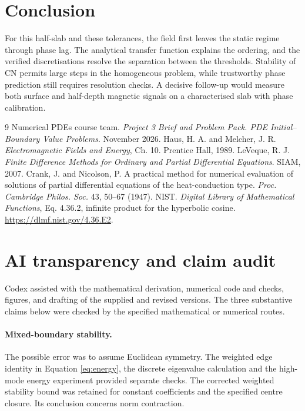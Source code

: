 \documentclass[11pt,a4paper]{article}
\begin{document}
\section{Conclusion}
For this half-slab and these tolerances, the field first leaves the static regime through phase lag. The analytical transfer function explains the ordering, and the verified discretisations resolve the separation between the thresholds. Stability of CN permits large steps in the homogeneous problem, while trustworthy phase prediction still requires resolution checks. A decisive follow-up would measure both surface and half-depth magnetic signals on a characterised slab with phase calibration.

\begin{thebibliography}{9}
 Numerical PDEs course team. \emph{Project 3 Brief and Problem Pack. PDE Initial--Boundary Value Problems}. November 2026.
 Haus, H. A. and Melcher, J. R. \emph{Electromagnetic Fields and Energy}, Ch. 10. Prentice Hall, 1989.
 LeVeque, R. J. \emph{Finite Difference Methods for Ordinary and Partial Differential Equations}. SIAM, 2007.
 Crank, J. and Nicolson, P. A practical method for numerical evaluation of solutions of partial differential equations of the heat-conduction type. \emph{Proc. Cambridge Philos. Soc.} 43, 50--67 (1947).
 NIST. \emph{Digital Library of Mathematical Functions}, Eq. 4.36.2, infinite product for the hyperbolic cosine. \url{https://dlmf.nist.gov/4.36.E2}.
\end{thebibliography}
\clearpage
\appendix
\section{AI transparency and claim audit}\label{app:audit}
Codex assisted with the mathematical derivation, numerical code and checks, figures, and drafting of the supplied and revised versions. The three substantive claims below were checked by the specified mathematical or numerical routes.

\paragraph{Mixed-boundary stability.} The possible error was to assume Euclidean symmetry. The weighted edge identity in Equation \eqref{eq:energy}, the discrete eigenvalue calculation and the high-mode energy experiment provided separate checks. The corrected weighted stability bound was retained for constant coefficients and the specified centre closure. Its conclusion concerns norm contraction.
\end{document}
